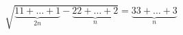 \documentclass[12pt]{article}
\begin{document}
\pagestyle{empty}
\begin{displaymath}
\sqrt{\underbrace{11 + \dots +1}_{2n} - \underbrace{22 + \dots +2}_{n}} = \underbrace{33 + \dots +3}_{n}
\end{displaymath}
\end{document}
